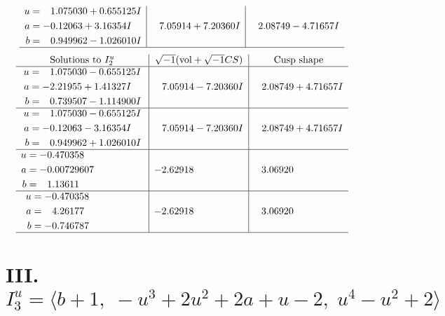 \documentclass[1p]{elsarticle_modified}
\theoremstyle{definition}
\newcommand{\I}{\sqrt{-1}}
\begin{document}
$$\begin{array}{c|c|c}
\begin{aligned}
u &= \phantom{-}1.075030 + 0.655125 I \\
a &= -0.12063 + 3.16354 I \\
b &= \phantom{-}0.949962 - 1.026010 I\end{aligned}
 & \phantom{-}7.05914 + 7.20360 I & \phantom{-}2.08749 - 4.71657 I\\
 \hline 
 \end{array}$$\newpage$$\begin{array}{c|c|c}  
\text{Solutions to }I^u_{2}& \I (\text{vol} + \sqrt{-1}CS) & \text{Cusp shape}\\
 \hline 
\begin{aligned}
u &= \phantom{-}1.075030 - 0.655125 I \\
a &= -2.21955 + 1.41327 I \\
b &= \phantom{-}0.739507 - 1.114900 I\end{aligned}
 & \phantom{-}7.05914 - 7.20360 I & \phantom{-}2.08749 + 4.71657 I \\ \hline\begin{aligned}
u &= \phantom{-}1.075030 - 0.655125 I \\
a &= -0.12063 - 3.16354 I \\
b &= \phantom{-}0.949962 + 1.026010 I\end{aligned}
 & \phantom{-}7.05914 - 7.20360 I & \phantom{-}2.08749 + 4.71657 I \\ \hline\begin{aligned}
u &= -0.470358\phantom{ +0.000000I} \\
a &= -0.00729607\phantom{ +0.000000I} \\
b &= \phantom{-}1.13611\phantom{ +0.000000I}\end{aligned}
 & -2.62918\phantom{ +0.000000I} & \phantom{-}3.06920\phantom{ +0.000000I} \\ \hline\begin{aligned}
u &= -0.470358\phantom{ +0.000000I} \\
a &= \phantom{-}4.26177\phantom{ +0.000000I} \\
b &= -0.746787\phantom{ +0.000000I}\end{aligned}
 & -2.62918\phantom{ +0.000000I} & \phantom{-}3.06920\phantom{ +0.000000I}\\
 \hline 
 \end{array}$$\newpage\newpage\renewcommand{\arraystretch}{1}
\centering \section*{III. $I^u_{3}= \langle b+1,\;- u^3+2 u^2+2 a+u-2,\;u^4- u^2+2 \rangle$}
\end{document}
